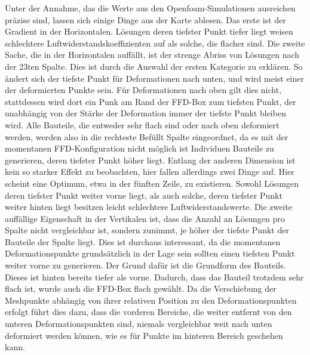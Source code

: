 Unter der Annahme, das die Werte aus den Openfoam-Simulationen ausreichen präzise sind, lassen sich einige Dinge aus der Karte ablesen.
Das erste ist der Gradient in der Horizontalen.
Lösungen deren tiefster Punkt tiefer liegt weisen schlechtere Luftwiderstandskoeffizienten auf als solche, die flacher sind.
Die zweite Sache, die in der Horizontalen auffällt, ist der strenge Abriss von Lösungen nach der 23ten Spalte.
Dies ist durch die Auswahl der ersten Kategorie zu erklären.
So ändert sich der tiefste Punkt für Deformationen nach unten, und wird meist einer der deformierten Punkte sein.
Für Deformationen nach oben gilt dies nicht, stattdessen wird dort ein Punk am Rand der FFD-Box zum tiefsten Punkt, der unabhängig von der Stärke der Deformation immer der tiefste Punkt bleiben wird.
Alle Bauteile, die entweder sehr flach sind oder nach oben deformiert werden, werden also in die rechteste Befüllt Spalte eingeordnet, da es mit der momentanen FFD-Konfiguration nicht möglich ist Individuen Bauteile zu generieren, deren tiefster Punkt höher liegt.
Entlang der anderen Dimension ist kein so starker Effekt zu beobachten, hier fallen allerdings zwei Dinge auf.
Hier scheint eine Optimum, etwa in der fünften Zeile, zu existieren.
Sowohl Lösungen deren tiefster Punkt weiter vorne liegt, als auch solche, deren tiefster Punkt weiter hinten liegt besitzen leicht schlechtere Luftwiderstandswerte.
Die zweite auffällige Eigenschaft in der Vertikalen ist, dass die Anzahl an Lösungen pro Spalte nicht vergleichbar ist, sondern zunimmt, je höher der tiefste Punkt der Bauteile der Spalte liegt.
Dies ist durchaus interessant, da die momentanen Deformationspunkte grundsätzlich in der Lage sein sollten einen tiefsten Punkt weiter vorne zu generieren.
Der Grund dafür ist die Grundform des Bauteils.
Dieses ist hinten bereits tiefer als vorne.
Dadurch, dass das Bauteil trotzdem sehr flach ist, wurde auch die FFD-Box flach gewählt.
Da die Verschiebung der Meshpunkte abhängig von ihrer relativen Position  zu den Deformationspunkten erfolgt führt dies dazu, dass die vorderen Bereiche, die weiter entfernt von den unteren Deformationspunkten sind, niemals vergleichbar weit nach unten deformiert werden können, wie es für Punkte im hinteren Bereich geschehen kann. 

